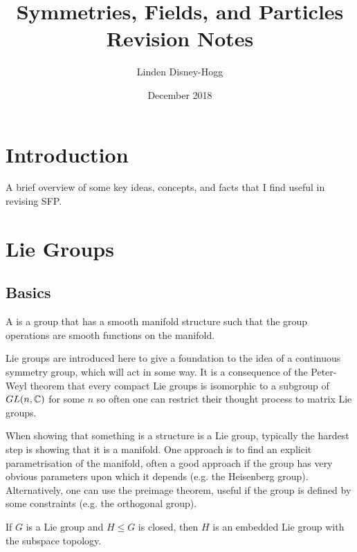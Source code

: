 \documentclass{article}
\title{Symmetries, Fields, and Particles Revision Notes}
\author{Linden Disney-Hogg}
\date{December 2018}
\begin{document}
\maketitle
\tableofcontents

\section{Introduction}
A brief overview of some key ideas, concepts, and facts that I find useful in revising SFP. 

\section{Lie Groups}
\subsection{Basics}
\begin{definition}
A  is a group that has a smooth manifold structure such that the group operations are smooth functions on the manifold. 
\end{definition}

\begin{idea}
Lie groups are introduced here to give a foundation to the idea of a continuous symmetry group, which will act in some way. It is a consequence of the Peter-Weyl theorem that every compact Lie groups is isomorphic to a subgroup of $GL(n,\mathbb{C})$ for some $n$ so often one can restrict their thought process to matrix Lie groups.
\end{idea}

\begin{idea}
When showing that something is a structure is a Lie group, typically the hardest step is showing that it is a manifold. One approach is to find an explicit parametrisation of the manifold, often a good approach if the group has very obvious parameters upon which it depends (e.g. the Heisenberg group). Alternatively, one can use the preimage theorem, useful if the group is defined by some constraints (e.g. the orthogonal group).
\end{idea}

\begin{theorem}
If $G$ is a Lie group and $H\leq G$ is closed, then $H$ is an embedded Lie group with the subspace topology. 
\end{theorem}
\end{document}

